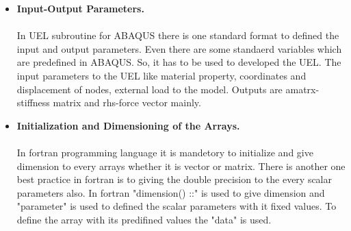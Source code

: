 \documentclass[12pt]{article}
\begin{document}
\begin{itemize}
	\item \textbf{Input-Output Parameters.} \\
	\\
	In UEL subroutine for ABAQUS there is one standard format to defined the input and output parameters. Even there are some standaerd variables which are predefined in ABAQUS. So, it has to be used to developed the UEL. The input parameters to the UEL like material property, coordinates and displacement of nodes, external load to the model. Outputs are amatrx-stiffness matrix and rhs-force vector mainly.
	\\
	\item \textbf{Initialization and Dimensioning of the Arrays.} \\
	\\
	In fortran programming language it is mandetory to initialize and give dimension to every arrays whether it is vector or matrix. There is another one best practice in fortran is to giving the double precision to the every scalar parameters also. In fortran "dimension() ::" is used to give dimension and "parameter" is used to defined the scalar parameters with it fixed values. To define the array with its predifined values the "data" is used.		
\end{itemize}
\end{document}
